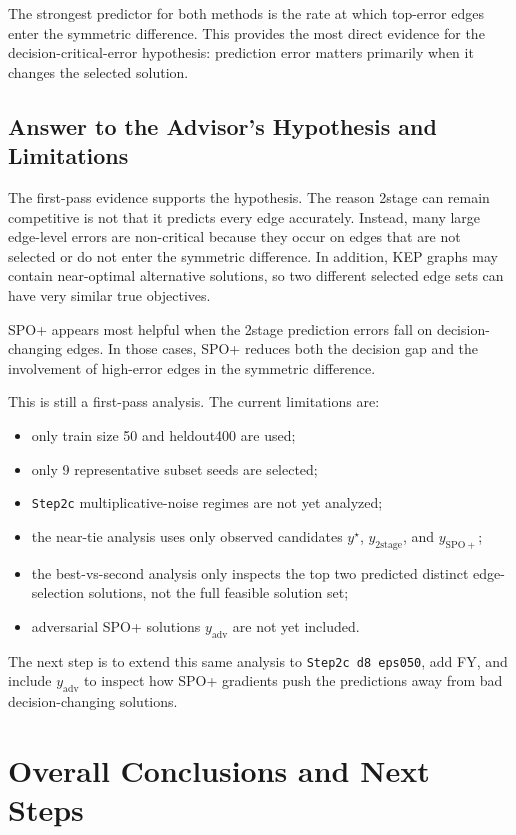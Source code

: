 \documentclass[11pt]{article}
\begin{document}
The strongest predictor for both methods is the rate at which top-error edges
enter the symmetric difference. This provides the most direct evidence for the
decision-critical-error hypothesis: prediction error matters primarily when it
changes the selected solution.

\subsection{Answer to the Advisor's Hypothesis and Limitations}
The first-pass evidence supports the hypothesis. The reason 2stage can remain
competitive is not that it predicts every edge accurately. Instead, many large
edge-level errors are non-critical because they occur on edges that are not
selected or do not enter the symmetric difference. In addition, KEP graphs may
contain near-optimal alternative solutions, so two different selected edge sets
can have very similar true objectives.

SPO+ appears most helpful when the 2stage prediction errors fall on
decision-changing edges. In those cases, SPO+ reduces both the decision gap and
the involvement of high-error edges in the symmetric difference.

This is still a first-pass analysis. The current limitations are:

\begin{itemize}
    \item only train size 50 and heldout400 are used;
    \item only 9 representative subset seeds are selected;
    \item \texttt{Step2c} multiplicative-noise regimes are not yet analyzed;
    \item the near-tie analysis uses only observed candidates
    $y^\star$, $y_{\mathrm{2stage}}$, and $y_{\mathrm{SPO+}}$;
    \item the best-vs-second analysis only inspects the top two predicted
    distinct edge-selection solutions, not the full feasible solution set;
    \item adversarial SPO+ solutions $y_{\mathrm{adv}}$ are not yet included.
\end{itemize}

The next step is to extend this same analysis to \texttt{Step2c d8 eps050}, add
FY, and include $y_{\mathrm{adv}}$ to inspect how SPO+ gradients push the
predictions away from bad decision-changing solutions.

\section{Overall Conclusions and Next Steps}
\label{sec:weekly-next-steps}
\end{document}
